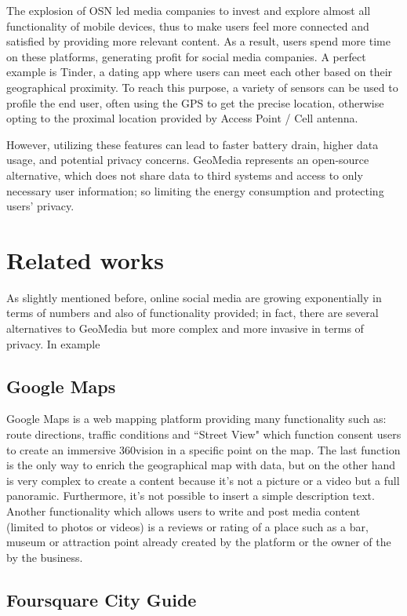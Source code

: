 \documentclass[conference]{IEEEtran}
\begin{document}
The explosion of OSN led media companies to invest and explore almost all functionality of mobile devices, thus to make users feel more connected and satisfied by providing more relevant content. As a result, users spend more time on these platforms, generating profit for social media companies.
A perfect example is Tinder, a dating app where users can meet each other based on their geographical proximity.
To reach this purpose, a variety of sensors can be used to profile the end user, often using the GPS to get the precise location, otherwise opting to the proximal location provided by Access Point / Cell antenna.

However, utilizing these features can lead to faster battery drain, higher data usage, and potential privacy concerns.
GeoMedia represents an open-source alternative, which does not share data to third systems and access to only necessary user information; so limiting the energy consumption and protecting users' privacy.
\\

\section{Related works}

As slightly mentioned before, online social media are growing exponentially in terms of numbers and also of functionality provided; in fact, there are several alternatives to GeoMedia but more complex and more invasive in terms of privacy.
In example
\subsection{Google Maps}
Google Maps\cite{GoogleMaps} is a web mapping platform providing many functionality such as: route directions, traffic conditions and ``Street View"\cite{StreetView} which function consent users to create an immersive 360\textdegree vision in a specific point on the map.
The last function is the only way to enrich the geographical map with data, but on the other hand is very complex to create a content because it's not a picture or a video but a full panoramic.
Furthermore, it's not possible to insert a simple description text.
\\
Another functionality which allows users to write and post media content (limited to photos or videos) is a reviews or rating of a place such as a bar, museum or attraction point already created by the platform or the owner of the by the business.

\subsection{Foursquare City Guide}
\end{document}
